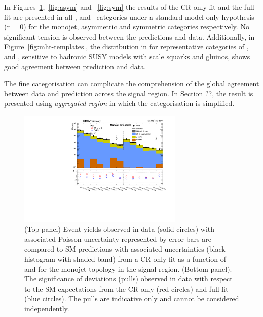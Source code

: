 In Figures~\ref{fig:mono},~\ref{fig:asym} and ~\ref{fig:sym} the results of the CR-only fit and the full fit are presented in all \scalht, \njet 
and \nb~categories under a standard model only hypothesis (r = 0) for the monojet, asymmetric 
and symmetric categories respectively. No significant tension is observed between the predictions
and data. Additionally, in Figure~\ref{fig:mht-templates}, the distribution in \mht for representative 
categories of \scalht, \njet and \nb, sensitive to hadronic SUSY models with \TeV scale squarks and gluinos, 
shows good agreement between prediction and data.

The fine categorisation can complicate the comprehension of the global agreement between data and 
prediction across the signal region. In Section ??, the result is presented using 
\emph{aggregated region} in which the categorisation is simplified. 

\begin{figure}[!h]
  \begin{center}
    \includegraphics[width=0.7\textwidth]{Figures/statisticalResults/summaryPlot_Monojet_prefit_overlay_fit_b}
    \caption{(Top panel) Event yields observed in data (solid circles) 
	with associated Poisson uncertainty represented by error bars 
	are compared to SM predictions with associated uncertainties (black
      histogram with shaded band) from a CR-only fit as a function of
      \nb and \scalht for the monojet topology in the
      signal region. (Bottom panel). The significance of deviations
      (pulls) observed in data with respect to the SM expectations
      from the CR-only (red circles) and full fit (blue circles). The
      pulls are indicative only and cannot be considered
      independently.}
    \label{fig:mono}
  \end{center}
\end{figure}

